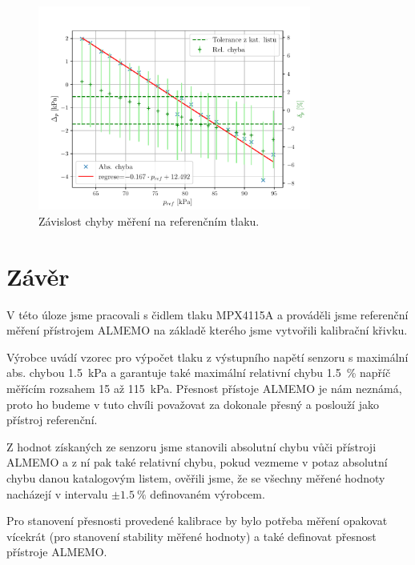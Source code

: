\documentclass{protokol}
\begin{document}
        \begin{figure}[h!]
            \centering
            \includegraphics[width=0.8\textwidth]{img/graf-3.pdf}
            \caption{Závislost chyby měření na referenčním tlaku.}
            \label{fig:img/graf-3}
        \end{figure}
        
        \clearpage
        \section*{Závěr}
            V této úloze jsme pracovali s čidlem tlaku MPX4115A a prováděli jsme referenční měření přístrojem ALMEMO na základě kterého jsme vytvořili kalibrační křivku. 
            
            Výrobce uvádí vzorec pro výpočet tlaku z výstupního napětí senzoru s maximální abs. chybou \qty{1.5}{kPa} a garantuje také maximální relativní chybu \qty{1.5}{\percent} napříč měřícím rozsahem 15 až \qty{115}{kPa}. Přesnost přístoje ALMEMO je nám neznámá, proto ho budeme v tuto chvíli považovat za dokonale přesný a poslouží jako přístroj referenční. 

            Z hodnot získaných ze senzoru jsme stanovili absolutní chybu vůči přístroji ALMEMO a z ní pak také relativní chybu, pokud vezmeme v potaz absolutní chybu danou katalogovým listem, ověřili jsme, že se všechny měřené hodnoty nacházejí v intervalu \(\pm \qty{1.5}{\percent}\) definovaném výrobcem.

            Pro stanovení přesnosti provedené kalibrace by bylo potřeba měření opakovat vícekrát (pro stanovení stability měřené hodnoty) a také definovat přesnost přístroje ALMEMO.
\end{document}
